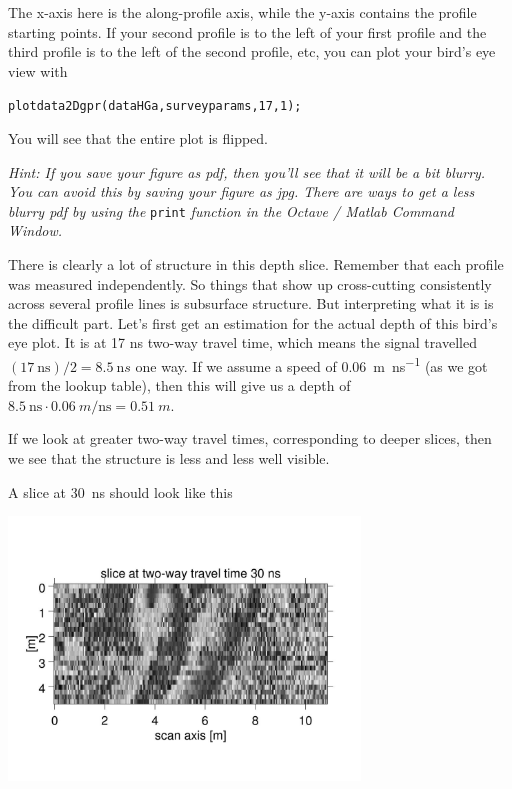 \documentclass[11pt]{article}
\begin{document}
The x-axis here is the along-profile axis, while the y-axis contains
the profile starting points. If your second profile is to the left of
your first profile and the third profile is to the left of the second
profile, etc, you can plot your bird's eye view with

\qquad \verb#plotdata2Dgpr(dataHGa,surveyparams,17,1);#

You will see that the entire plot is flipped.

\emph{Hint: If you save your figure as pdf, then you'll see that it will be
a bit blurry. You can avoid this by saving your figure as jpg. There
are ways to get a less blurry pdf by using the} \verb#print# \emph{function
in the Octave / Matlab Command Window.}

There is clearly a lot of structure in this depth slice. Remember that
each profile was measured independently. So things that show up
cross-cutting consistently across several profile lines is subsurface
structure. But interpreting what it is is the difficult part. Let's
first get an estimation for the actual depth of this bird's eye
plot. It is at 17 ns two-way travel time, which means the signal
travelled $(\SI{17}{\ns}) / 2 = \SI{8.5}{\nano s}$ one way. If we
assume a speed of \SI{0.06}{m\per\ns} (as we got from the lookup
table), then this will give us a depth of $\SI{8.5}{\ns} \cdot
\SI{0.06}{m\per\ns} = \SI{0.51}{m}$.

If we look at greater two-way travel times, corresponding to deeper
slices, then we see that the structure is less and less well
visible.

A slice at \SI{30}{ns} should look like this
\begin{center}
\includegraphics[width=0.7\textwidth, trim = 1cm 3cm 1cm
  3cm,clip]{figures/Area30ns.jpg}
\end{center}
\end{document}
